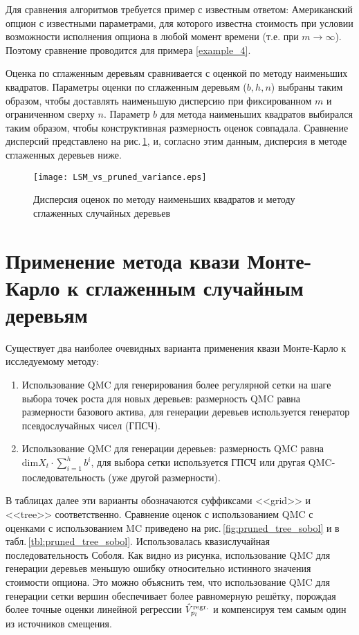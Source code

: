 Для сравнения алгоритмов требуется пример с известным ответом: Американский опцион с известными параметрами, для которого известна стоимость при условии возможности исполнения опциона в любой момент времени (т.е. при $m \to \infty$). Поэтому сравнение проводится для примера \ref{example_4}.

Оценка по сглаженным деревьям сравнивается с оценкой по методу наименьших квадратов. Параметры оценки по сглаженным деревьям ($b, h, n$) выбраны таким образом, чтобы доставлять наименьшую дисперсию при фиксированном $m$ и ограниченном сверху $n$. Параметр $b$ для метода наименьших квадратов выбирался таким образом, чтобы конструктивная размерность оценок совпадала. Сравнение дисперсий представлено на рис.\,\ref{fig:lsm_vs_pruned_variance}, и, согласно этим данным, дисперсия в методе сглаженных деревьев ниже.

\begin{figure}[h]
    \begin{center}
    \texttt{[image: LSM\_vs\_pruned\_variance.eps]}\end{center}
    \caption{Дисперсия оценок по методу наименьших квадратов и методу сглаженных случайных деревьев}
    \label{fig:lsm_vs_pruned_variance}
\end{figure}


\section{Применение метода квази Монте-Карло к сглаженным случайным деревьям} %
\label{sec:results:qmc_to_pruned_trees}

Существует два наиболее очевидных варианта применения квази Монте-Карло к исследуемому методу:

\begin{enumerate}
	\item Использование QMC для генерирования более регулярной сетки на шаге выбора точек роста для новых деревьев: размерность QMC равна размерности базового актива, для генерации деревьев используется генератор псевдослучайных чисел (ГПСЧ).
	\item Использование QMC для генерации деревьев: размерность QMC равна $\mathrm{dim} X_t \cdot \sum_{i=1}^h b^i$, для выбора сетки используется ГПСЧ или другая QMC-последовательность (уже другой размерности).
\end{enumerate}

В таблицах далее эти варианты обозначаются суффиксами <<grid>> и <<tree>> соответственно. Сравнение оценок с использованием QMC с оценками с использованием MC приведено на рис.\,\ref{fig:pruned_tree_sobol} и в табл.\,\ref{tbl:pruned_tree_sobol}. Использовалась квазислучайная последовательность Соболя. Как видно из рисунка, использование QMC для генерации деревьев меньшую ошибку относительно истинного значения стоимости опциона. Это можно объяснить тем, что использование QMC для генерации сетки вершин обеспечивает более равномерную решётку, порождая более точные оценки линейной регрессии $\hat{V}^{\mathrm{regr.}}_{p_l}$ и компенсируя тем самым один из источников смещения.

